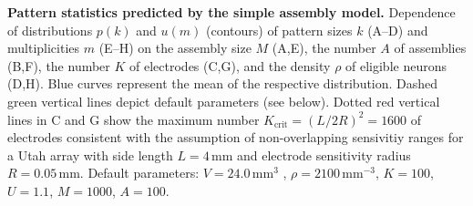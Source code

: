 
{\bf Pattern statistics predicted by the simple assembly model.} 
Dependence of distributions $p(k)$ and $u(m)$ (contours) of pattern sizes $k$ (A--D) and multiplicities $m$ (E--H)
on the assembly size $M$ (A,E), the number $A$ of assemblies (B,F), the number $K$ of electrodes (C,G), and 
the density $\rho$ of eligible neurons (D,H).
Blue curves represent the mean of the respective distribution.
Dashed green vertical lines depict default parameters (see below).
Dotted red vertical lines in C and G show the maximum number $K_\text{crit}=(L/2R)^2=1600$ of electrodes 
consistent with the assumption of non-overlapping sensivitiy ranges for a Utah array with side length $L=4\,\text{mm}$ 
and electrode sensitivity radius $R=0.05\,\text{mm}$.
Default parameters: $V=24.0\,\text{mm}^3$ , $\rho=2100\,\text{mm}^{-3}$, $K=100$, $U=1.1$, $M=1000$, $A=100$.
    